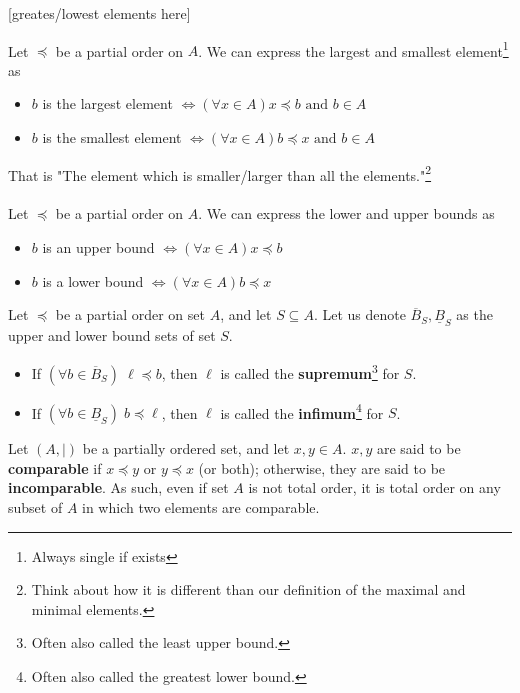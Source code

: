 \documentclass{tufte-handout} %
\theoremstyle{definition}
\theoremstyle{remark}
\begin{document}
[greates/lowest elements here]

Let $\preccurlyeq$ be a partial order on $A$. We can express the largest and smallest element\footnote{Always single if exists} as
\begin{itemize}
    \item $b$ is the largest element $\Longleftrightarrow (\forall x\in A) x \preccurlyeq b \text{ and } b \in A$
    \item $b$ is the smallest element $\Longleftrightarrow(\forall x\in A) b \preccurlyeq x \text{ and } b \in A$ 
\end{itemize}

That is "The element which is smaller/larger than all the elements."\footnote{Think about how it is different than our definition of the maximal and minimal elements.} \\\\

Let $\preccurlyeq$ be a partial order on $A$. We can express the lower and upper bounds as
\begin{itemize}
    \item $b$ is an upper bound $\Longleftrightarrow (\forall x\in A) x \preccurlyeq b$
    \item $b$ is a lower bound $\Longleftrightarrow(\forall x\in A) b \preccurlyeq x$ 
\end{itemize}


Let $\preccurlyeq$ be a partial order on set $A$, and let $S\subseteq A$. Let us denote $\overline{B}_{S}, \underline{B}_{S}$ as the upper and lower bound sets of set $S$.
\begin{itemize}
    \item If $(\forall b \in \overline{B}_{S}) \; \ell \preccurlyeq b$, then $\ell$ is called the \textbf{supremum}\footnote{Often also called the least upper bound.} for $S$.
    \item If $(\forall b \in \underline{B}_{S})\; b \preccurlyeq \ell$, then $\ell$ is called the \textbf{infimum}\footnote{Often also called the greatest lower bound.} for $S$.
\end{itemize}
Let $(A,|)$ be a partially ordered set, and let $x,y \in A$. $x,y$ are said to be \textbf{comparable} if $x\preccurlyeq y$ or $y \preccurlyeq x$ (or both); otherwise, they are said to be \textbf{incomparable}. As such, even if set $A$ is not total order, it is total order on any subset of $A$ in which two elements are comparable. 
\end{document}
